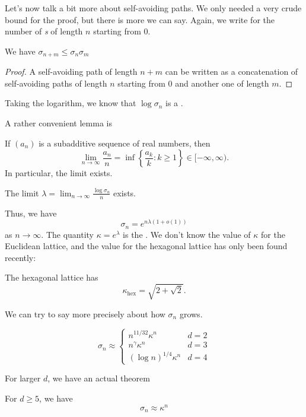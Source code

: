 \documentclass[a4paper]{article}
\begin{document}
Let's now talk a bit more about self-avoiding paths. We only needed a very crude bound for the proof, but there is more we can say. Again, we write  for the number of \emph{s} of length $n$ starting from $0$.

\begin{lemma}
  We have $\sigma_{n + m} \leq \sigma_n \sigma_m$
\end{lemma}

\begin{proof}
  A self-avoiding path of length $n + m$ can be written as a concatenation of self-avoiding paths of length $n$ starting from $0$ and another one of length $m$.
\end{proof}
Taking the logarithm, we know that $\log \sigma_n$ is a .

A rather convenient lemma is
\begin{lemma}
  If $(a_n)$ is a subadditive sequence of real numbers, then
  \[
    \lim_{n \to \infty} \frac{a_n}{n} = \inf\left\{\frac{a_k}{k}: k \geq 1\right\} \in [-\infty, \infty).
  \]
  In particular, the limit exists.
\end{lemma}

\begin{cor}
  The limit $\lambda = \lim_{n \to \infty} \frac{\log \sigma_n}{n}$ exists.
\end{cor}
Thus, we have
\[
  \sigma_n= e^{n \lambda (1 + o(1))}
\]
as $n \to \infty$. The quantity \index{$\kappa$}$\kappa = e^\lambda$ is the . We don't know the value of $\kappa$ for the Euclidean lattice, and the value for the hexagonal lattice has only been found recently:
\begin{thm} %
  The hexagonal lattice has
  \[
    \kappa_{\mathrm{hex}} = \sqrt{2 + \sqrt{2}}.
  \]
\end{thm}
We can try to say more precisely about how $\sigma_n$ grows.
\begin{conjecture}
  \[
    \sigma_n \approx
    \begin{cases}
      n^{11/32} \kappa^n & d = 2\\
      n^\gamma \kappa^n & d = 3\\
      (\log n)^{1/4} \kappa^n & d = 4
    \end{cases}
  \]
\end{conjecture}

For larger $d$, we have an actual theorem
\begin{thm} %
  For $d \geq 5$, we have
  \[
    \sigma_n \approx \kappa^n
  \]
\end{thm}
\end{document}
